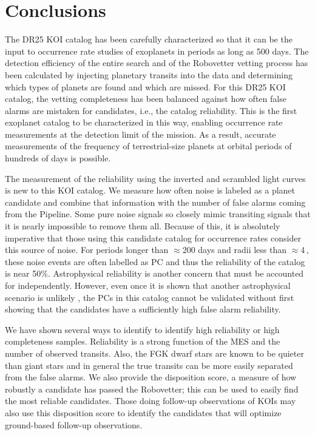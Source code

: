 

\section{Conclusions}
\label{s:conclusions}

The DR25 KOI catalog has been carefully characterized so that it can be the input to occurrence rate studies of exoplanets in periods as long as 500 days. The detection efficiency of the entire search \citep{Burke2017b,Christiansen2017} and of the Robovetter vetting process \citep{Coughlin2017a} has been calculated by injecting planetary transits into the data and determining which types of planets are found and which are missed. For this DR25 KOI catalog, the vetting completeness has been balanced against how often false alarms are mistaken for candidates, i.e., the catalog reliability. This is the first \Kepler{} exoplanet catalog to be characterized in this way, enabling occurrence rate measurements at the detection limit of the mission.  As a result, accurate measurements of the frequency of terrestrial-size planets at orbital periods of hundreds of days is possible.

The measurement of the reliability using the inverted and scrambled light curves is new to this KOI catalog. We measure how often noise is labeled as a planet candidate and combine that information with the number of false alarms coming from the \Kepler{} Pipeline. Some pure noise signals so closely mimic transiting signals that it is nearly impossible to remove them all. Because of this, it is absolutely imperative that those using this candidate catalog for occurrence rates consider this source of noise. For periods longer than $\approx$200 days and radii less than $\approx$4\,\Rearth, these noise events are often labelled as PC and thus the reliability of the catalog is near 50\%.  Astrophysical reliability is another concern that must be accounted for independently.  However, even once it is shown that another astrophysical scenario is unlikely \citep[as was done for the DR24 KOIs in][]{Morton2016}, the PCs in this catalog cannot be validated without first showing that the candidates have a sufficiently high false alarm reliability. 

We have shown several ways to identify to identify high reliability or high completeness samples. Reliability is a strong function of the MES and the number of observed transits. Also, the FGK dwarf stars are known to be quieter than giant stars and in general the true transits can be more easily separated from the false alarms. We also provide the disposition score, a measure of how robustly a candidate has passed the Robovetter; this can be used to easily find the most reliable candidates. Those doing follow-up observations of KOIs may also use this disposition score to identify the candidates that will optimize ground-based follow-up observations.  

